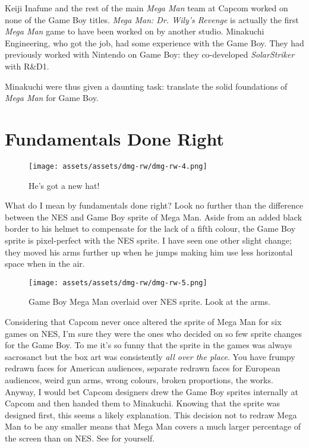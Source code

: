 \documentclass{book}
\begin{document}
Keiji Inafune and the rest of the main \emph{Mega Man} team at Capcom worked on none of the Game Boy titles. \emph{Mega Man: Dr. Wily’s Revenge} is actually the first \emph{Mega Man} game to have been worked on by another studio. Minakuchi Engineering, who got the job, had some experience with the Game Boy. They had previously worked with Nintendo on Game Boy: they co-developed \emph{SolarStriker} with R\&D1.

Minakuchi were thus given a daunting task: translate the solid foundations of \emph{Mega Man} for Game Boy.

\FloatBarrier\needspace{5pt}\section*{Fundamentals Done Right}\nopagebreak[4]

\begin{figure}[hbt]
\vskip 10pt
\centering \texttt{[image: assets/assets/dmg-rw/dmg-rw-4.png]}\par\pagetwodescription He’s got a new hat!
\vskip 6pt
\end{figure}
What do I mean by fundamentals done right? Look no further than the difference between the NES and Game Boy sprite of Mega Man. Aside from an added black border to his helmet to compensate for the lack of a fifth colour, the Game Boy sprite is pixel-perfect with the NES sprite. I have seen one other slight change; they moved his arms further up when he jumps making him use less horizontal space when in the air.

\begin{figure}[hbt]
\vskip 10pt
\centering \texttt{[image: assets/assets/dmg-rw/dmg-rw-5.png]}\par\pagetwodescription Game Boy Mega Man overlaid over NES sprite. Look at the arms.
\vskip 6pt
\end{figure}
Considering that Capcom never once altered the sprite of Mega Man for six games on NES, I’m sure they were the ones who decided on so few sprite changes for the Game Boy. To me it’s so funny that the sprite in the games was always sacrosanct but the box art was consistently \emph{all over the place}. You have frumpy redrawn faces for American audiences, separate redrawn faces for European audiences, weird gun arms, wrong colours, broken proportions, the works. Anyway, I would bet Capcom designers drew the Game Boy sprites internally at Capcom and then handed them to Minakuchi. Knowing that the sprite was designed first, this seems a likely explanation. This decision not to redraw Mega Man to be any smaller means that Mega Man covers a much larger percentage of the screen than on NES. See for yourself.
\end{document}
